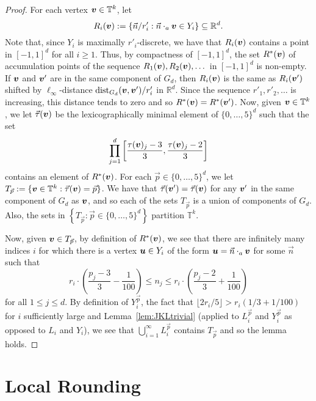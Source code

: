 \documentclass[12pt,a4paper]{amsart}
\numberwithin{equation}{section}
\theoremstyle{definition}
\begin{document}
\begin{proof}
For each vertex $\boldsymbol{v}\in\mathbb{T}^k$, let 
\[R_i(\boldsymbol{v}):=\{\vec{n}/r'_i: \vec{n}\cdot_a\boldsymbol{v}\in Y_i\}\subseteq \mathbb{R}^d.\]
Note that, since $Y_i$ is maximally $r'_i$-discrete, we have that $R_i(\boldsymbol{v})$ contains a point in $[-1,1]^d$ for all $i\geq1$. Thus, by compactness of $[-1,1]^d$, the set $R^*(\boldsymbol{v})$ of accumulation points of the sequence $R_1(\boldsymbol{v}),R_2(\boldsymbol{v}),\dots$ in $[-1,1]^d$ is non-empty. If $\boldsymbol{v}$ and $\boldsymbol{v}'$ are in the same component of $G_d$, then $R_i(\boldsymbol{v})$ is the same as $R_i(\boldsymbol{v}')$ shifted by $\ell_\infty$-distance $\operatorname{dist}_{G_d}(\boldsymbol{v},\boldsymbol{v}')/r'_i$ in $\mathbb{R}^d$. Since the sequence $r'_1,r'_2,\dots$ is increasing, this distance tends to zero and so $R^*(\boldsymbol{v})=R^*(\boldsymbol{v}')$. Now, given $\boldsymbol{v}\in\mathbb{T}^k$, we let $\vec{\tau}(\boldsymbol{v})$ be the lexicographically minimal element of $\{0,\dots,5\}^d$ such that the set
\[\prod_{j=1}^d\left[\frac{\tau(\boldsymbol{v})_j-3}{3},\frac{\tau(\boldsymbol{v})_j-2}{3}\right]\]
contains an element of $R^*(\boldsymbol{v})$. For each $\vec{p}\in\{0,\dots,5\}^d$, we let $T_{\vec{p}}:=\{\boldsymbol{v}\in\mathbb{T}^k: \vec{\tau}(\boldsymbol{v})=\vec{p}\}$. We have that $\vec{\tau}(\boldsymbol{v}')=\vec{\tau}(\boldsymbol{v})$ for any $\boldsymbol{v}'$ in the same component of $G_d$ as $\boldsymbol{v}$, and so each of the sets $T_{\vec{p}}$ is a union of components of $G_d$. Also, the sets in $\left\{T_{\vec{p}}:\vec{p}\in\{0,\dots,5\}^d\right\}$ partition $\mathbb{T}^k$. 

Now, given $\boldsymbol{v}\in T_{\vec{p}}$, by definition of $R^*(\boldsymbol{v})$, we see that there are infinitely many indices $i$ for which there is a vertex $\boldsymbol{u}\in Y_i$ of the form $\boldsymbol{u}=\vec{n}\cdot_a\boldsymbol{v}$ for some $\vec{n}$ such that 
\[r_i\cdot \left(\frac{p_j-3}{3} - \frac{1}{100}\right)\leq n_j\leq r_i\cdot \left(\frac{p_j-2}{3} + \frac{1}{100}\right)\]
for all $1\leq j\leq d$. By definition of $Y_i^{\vec{p}}$, the fact that $\lfloor 2r_i/5\rfloor> r_i(1/3+1/100)$ for $i$ sufficiently large and Lemma~\ref{lem:JKLtrivial} (applied to $L_i^{\vec{p}}$ and $Y_i^{\vec{p}}$ as opposed to $L_i$ and $Y_i$), we see that $\bigcup_{i=1}^\infty L_i^{\vec{p}}$ contains $T_{\vec{p}}$ and so the lemma holds. 
\end{proof}


\section{Local Rounding}
\label{sec:integerFlow}
\end{document}
